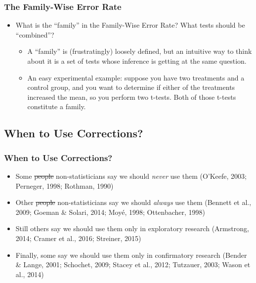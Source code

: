 \begin{frame}
\frametitle{The Family-Wise Error Rate}
\begin{itemize}
    \item What is the ``family'' in the Family-Wise Error Rate? What tests should be ``combined''?
    \begin{itemize}
        \item A ``family'' is (frustratingly) loosely defined, but an intuitive way to think about it is a set of tests whose inference is getting at the same question.
        \item An easy experimental example: suppose you have two treatments and a control group, and you want to determine if either of the treatments increased the mean, so you perform two t-tests. Both of those t-tests constitute a family.
    \end{itemize}
\end{itemize}
\end{frame}





\subsection{When to Use Corrections?}



\begin{frame}
\frametitle{When to Use Corrections?}
\begin{itemize}
    \item Some \sout{people} non-statisticians say we should \textit{never} use them (O'Keefe, 2003; Perneger, 1998; Rothman, 1990)
    \item Other \sout{people} non-statisticians say we should \textit{always} use them (Bennett  et  al., 2009; Goeman \& Solari, 2014; Moy\'{e}, 1998; Ottenbacher, 1998)
    \item Still others say we should use them only in exploratory research (Armstrong, 2014; Cramer et al., 2016; Streiner, 2015)
    \item Finally, some say we should use them only in confirmatory research (Bender \& Lange, 2001; Schochet, 2009; Stacey et al., 2012; Tutzauer, 2003; Wason et al., 2014)
\end{itemize}
\end{frame}

